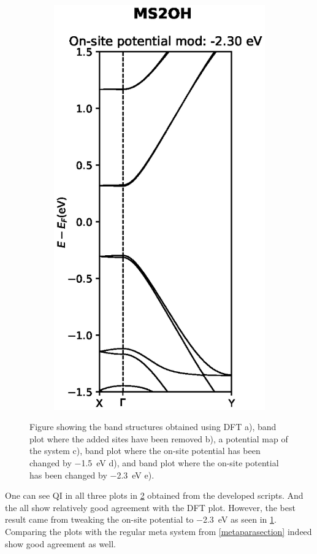 \begin{figure}[h]
\begin{subfigure}[b]{0.3\textwidth}
		\includegraphics[width=\textwidth]{Figures/MS2OHmod2.eps}
		\vspace{-2.5\baselineskip}
		\caption{}
		\label{MS2OHdevmod2}
	\end{subfigure}
	\caption{Figure showing the band structures obtained using DFT a), band plot where the added sites have been removed b), a potential map of the system c), band plot where the on-site potential has been changed by \SI{-1.5}{\electronvolt} d), and band plot where the on-site potential has been changed by \SI{-2.3}{\electronvolt} e).}
	\label{MS2OH}
\end{figure}
One can see QI in all three plots in \cref{MS2OH} obtained from the developed scripts. And the all show relatively good agreement with the DFT plot. However, the best result came from tweaking the on-site potential to \SI{-2.3}{\electronvolt} as seen in \cref{MS2OHdevmod2}. Comparing the plots with the regular meta system from \cref{metaparasection} indeed show good agreement as well.

